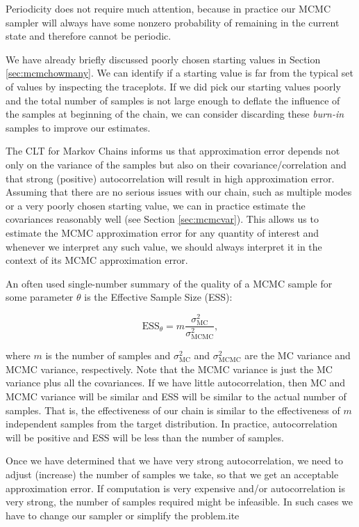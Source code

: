 \documentclass{book}
\theoremstyle{plain}%
\theoremstyle{definition}
\begin{document}
Periodicity does not require much attention, because in practice our MCMC sampler will always have some nonzero probability of remaining in the current state and therefore cannot be periodic.

We have already briefly discussed poorly chosen starting values in Section \ref{sec:mcmchowmany}. We can identify if a starting value is far from the typical set of values by inspecting the traceplots. If we did pick our starting values poorly and the total number of samples is not large enough to deflate the influence of the samples at beginning of the chain, we can consider discarding these \emph{burn-in} samples to improve our estimates.

The CLT for Markov Chains informs us that approximation error depends not only on the variance of the samples but also on their covariance/correlation and that strong (positive) autocorrelation will result in high approximation error. Assuming that there are no serious issues with our chain, such as multiple modes or a very poorly chosen starting value, we can in practice estimate the covariances reasonably well (see Section \ref{sec:mcmcvar}). This allows us to estimate the MCMC approximation error for any quantity of interest and whenever we interpret any such value, we should always interpret it in the context of its MCMC approximation error.

An often used single-number summary of the quality of a MCMC sample for some parameter $\theta$ is the Effective Sample Size (ESS):

$$\text{ESS}_\theta = m\frac{\sigma^2_\text{MC}}{\sigma^2_\text{MCMC}},$$

where $m$ is the number of samples and $\sigma^2_\text{MC}$ and $\sigma^2_\text{MCMC}$ are the MC variance and MCMC variance, respectively. Note that the MCMC variance is just the MC variance plus all the covariances. If we have little autocorrelation, then MC and MCMC variance will be similar and ESS will be similar to the actual number of samples. That is, the effectiveness of our chain is similar to the effectiveness of $m$ independent samples from the target distribution. In practice, autocorrelation will be positive and ESS will be less than the number of samples.

Once we have determined that we have very strong autocorrelation, we need to adjust (increase) the number of samples we take, so that we get an acceptable approximation error. If computation is very expensive and/or autocorrelation is very strong, the number of samples required might be infeasible. In such cases we have to change our sampler or simplify the problem.ite
\end{document}
